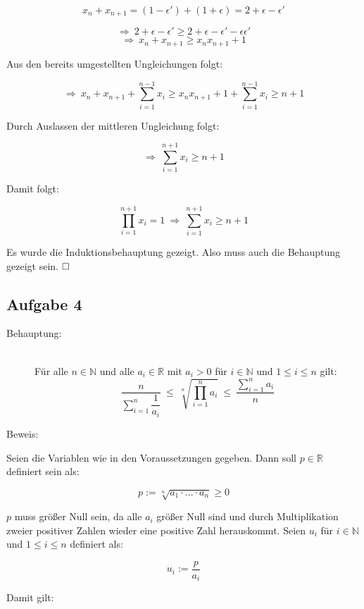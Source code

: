 \documentclass[11pt, a4paper]{article}
\begin{document}
		\[ x_n + x_{n+1} = (1-\epsilon') + (1+ \epsilon) = 2 + \epsilon -\epsilon' \]


		\[ \Rightarrow \ 2 + \epsilon -\epsilon' \geq 2 + \epsilon -\epsilon' - \epsilon\epsilon' \]
		\[ \Rightarrow \ x_n + x_{n+1} \geq x_nx_{n+1} + 1 \]

		Aus den bereits umgestellten Ungleichungen folgt:

		\[ \Rightarrow \ x_n + x_{n+1} + \sum_{i=1}^{n-1} x_i \geq x_nx_{n+1} + 1 + \sum_{i=1}^{n-1} x_i \geq n+1 \]

		Durch Auslassen der mittleren Ungleichung folgt:

		\[ \Rightarrow \ \sum_{i=1}^{n+1} x_i \geq n+1 \]

		Damit folgt:

		\[ \prod_{i=1}^{n+1} x_i = 1 \ \Longrightarrow \ \sum_{i=1}^{n+1} x_i \geq n+1 \]

		Es wurde die Induktionsbehauptung gezeigt. Also muss auch die Behauptung gezeigt sein. $\hfill\Box$



	\newpage

	\subsection*{Aufgabe 4}

		\begin{description}
			\item[Behauptung:]\hfill \\
				Für alle $n \in \mathbb{N}$ und alle $a_i \in \mathbb{R}$ mit $a_i > 0$ für $i \in \mathbb{N}$ und $1\leq i \leq n$ gilt: \\
				\[ \dfrac{n}{\sum_{i=1}^n \dfrac{1}{a_i}} \ \leq \ \sqrt[n]{\prod_{i=1}^n a_i} \ \leq \ \dfrac{\sum_{i=1}^n a_i}{n} \] \hfill 
			\item[Beweis:]
		\end{description} 

		Seien die Variablen wie in den Voraussetzungen gegeben. Dann soll $p \in \mathbb{R}$ definiert sein als:

		\[ p := \sqrt[n]{a_1\cdot ... \cdot a_n} \geq 0 \]

		$p$ muss größer Null sein, da alle $a_i$ größer Null sind und durch Multiplikation zweier positiver Zahlen wieder eine positive Zahl herauskommt. 
		Seien $u_i$ für $i \in \mathbb{N}$ und $1\leq i \leq n$ definiert als:

		\[ u_i := \dfrac{p}{a_i} \]

		Damit gilt: 
\end{document}

